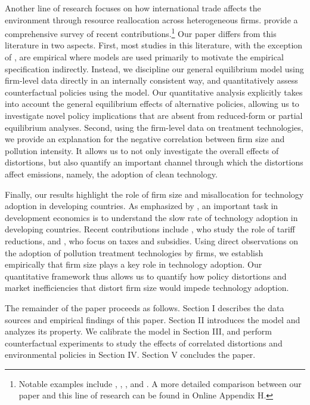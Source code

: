 \documentclass[AEJ]{AEA}
\begin{document}
Another line of research focuses on how international trade affects the environment through resource reallocation across heterogeneous firms. \citet{Cherniwchanetal:2017} provide a comprehensive survey of recent contributions.\footnote{Notable examples include \citet{Martin:2013}, \citet{Cherniwchan:2017}, \citet{BarrowsOllivier:2016}, \citet{Forslidetal:2015} and \citet{ShapiroWalker:2015}. A more detailed comparison between our paper and this line of research can be found in Online Appendix H.} Our paper differs from this literature in two aspects. First, most studies in this literature, with the exception of \citet{ShapiroWalker:2015}, are empirical where models are used primarily to motivate the empirical specification indirectly. Instead, we discipline our general equilibrium model using firm-level data directly in an internally consistent way, and quantitatively assess counterfactual policies using the model. Our quantitative analysis explicitly takes into account the general equilibrium effects of alternative policies, allowing us to investigate novel policy implications that are absent from reduced-form or partial equilibrium analyses. Second, using the firm-level data on treatment technologies, we provide an explanation for the negative correlation between firm size and pollution intensity. It allows us to not only investigate the overall effects of distortions, but also quantify an important channel through which the distortions affect emissions, namely, the adoption of clean technology.

Finally, our results highlight the role of firm size and misallocation for technology adoption in developing countries. As emphasized by \citet{ParentePrescott:1994, ParentePrescott:1999}, an important task in development economics is to understand the slow rate of technology adoption in developing countries. Recent contributions include \citet{Bustos:2011}, who study the role of tariff reductions, and \citet{Acemogluetal:2012}, who focus on taxes and subsidies. Using direct observations on the adoption of pollution treatment technologies by firms, we establish empirically that firm size plays a key role in technology adoption. Our quantitative framework thus allows us to quantify how policy distortions and market inefficiencies that distort firm size would impede technology adoption.

The remainder of the paper proceeds as follows. Section I describes the data sources and empirical findings of this paper. Section II introduces the model and analyzes its property. We calibrate the model in Section III, and perform counterfactual experiments to study the effects of correlated distortions and environmental policies in Section IV. Section V concludes the paper.
\end{document}
